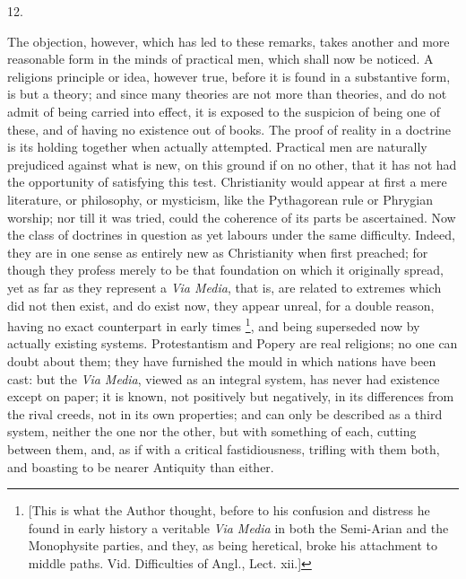 12.

The objection, however, which has led to these remarks, takes
another and more reasonable form in the minds of practical men, which
shall now be noticed. A religions principle or idea, however true,
before it is found in a substantive form, is but a theory; and since
many theories are not more than theories, and do not admit of
being carried into effect, it is exposed to the suspicion of being one
of these, and of having no existence out of books. The proof of
reality in a doctrine is its holding together when actually attempted.
Practical men are naturally prejudiced against what is new, on this
ground if on no other, that it has not had the opportunity of
satisfying this test. Christianity would appear at first a mere
literature, or philosophy, or mysticism, like the Pythagorean rule or
Phrygian worship; nor till it was tried, could the coherence of its
parts be ascertained. Now the class of doctrines in question as yet
labours under the same difficulty. Indeed, they are in one sense as
entirely new as Christianity when first preached; for though they
profess merely to be that foundation on which it originally spread,
yet as far as they represent a \emph{Via Media}, that is, are related
to extremes which did not then exist, and do exist now, they appear
unreal, for a double reason, having no exact counterpart in early
times \footnote{[This is what the Author thought, before to
his confusion and distress he found in early history a veritable \emph{Via
Media} in both the Semi-Arian and the Monophysite parties, and
they, as being heretical, broke his attachment to middle paths. Vid.
Difficulties of Angl., Lect. xii.]}, and being
superseded now by actually existing systems. Protestantism and Popery
are real religions; no one can doubt about them; they have furnished
the mould in which nations have been cast: but the \emph{Via Media},
viewed as an integral system, has never had existence except on paper;
it is known, not positively but negatively, in its differences from
the rival creeds, not in its own properties; and can only be described
as a third system, neither the one nor the other, but with something
of each, cutting between them, and, as if with a critical
fastidiousness, trifling with them both, and boasting to be nearer
Antiquity than either.

